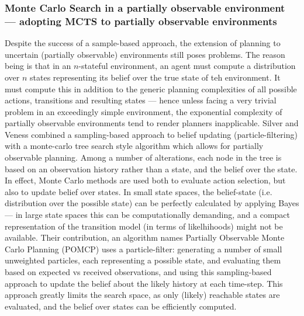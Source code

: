 \subsubsection{Monte Carlo Search in a partially observable environment --- adopting MCTS to partially observable environments}
Despite the success of a sample-based approach, the extension of planning to uncertain (partially observable) environments still poses problems. The reason being is that in an $n$-stateful environment, an agent must compute a distribution over $n$ states representing its belief over the true state of teh environment. It must compute this in addition to the generic planning complexities of all possible actions, transitions and resulting states --- hence unless facing a very trivial problem in an exceedingly simple environment, the exponential complexity of partially observable environments tend to render planners inapplicable. 
\newline \newline
Silver and Veness  \cite{Silver2010} combined a sampling-based approach to belief updating (particle-filtering) with a monte-carlo tree search style algorithm which allows for partially observable planning. Among a number of alterations, each node in the tree is based on an observation history rather than a state, and the belief over the state. In effect, Monte Carlo methods are used both to evaluate action selection, but also to update belief over states. 
\newline \newline
In small state spaces, the belief-state (i.e. distribution over the possible state) can be perfectly calculated by applying Bayes --- in large state spaces this can be computationally demanding, and a compact representation of the transition model (in terms of likelhihoods) might not be available. Their contribution, an algorithm names Partially Observable Monte Carlo Planning (POMCP) uses a particle-filter: generating a number of small unweighted particles, each representing a possible state, and evaluating them based on expected vs received observations, and using this sampling-based approach to update the belief about the likely history at each time-step.
\newline \newline
This approach greatly limits the search space, as only (likely) reachable states are evaluated, and the belief over states can be efficiently computed.

